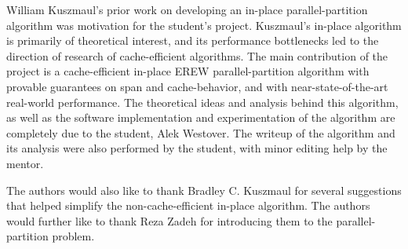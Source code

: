 \documentclass[11pt]{article}
\theoremstyle{remark}
\theoremstyle{remark}
\begin{document}
William Kuszmaul's prior work on developing an in-place parallel-partition algorithm was motivation for the student's project.
Kuszmaul's in-place algorithm is primarily of theoretical interest, and its performance bottlenecks led to the direction of research of cache-efficient algorithms.
The main contribution of the project is a cache-efficient in-place EREW parallel-partition algorithm with provable guarantees on span and cache-behavior, and with near-state-of-the-art real-world performance.
  The theoretical ideas and analysis behind this algorithm, as well as the software implementation and experimentation of the algorithm are completely due to the student, Alek Westover. The writeup of the algorithm and its analysis were also performed by the student, with minor editing help by the mentor.




The authors would also like to thank Bradley C. Kuszmaul for several
suggestions that helped simplify the non-cache-efficient in-place
algorithm. The authors would further like to thank Reza Zadeh for
introducing them to the parallel-partition problem.
\end{document}
